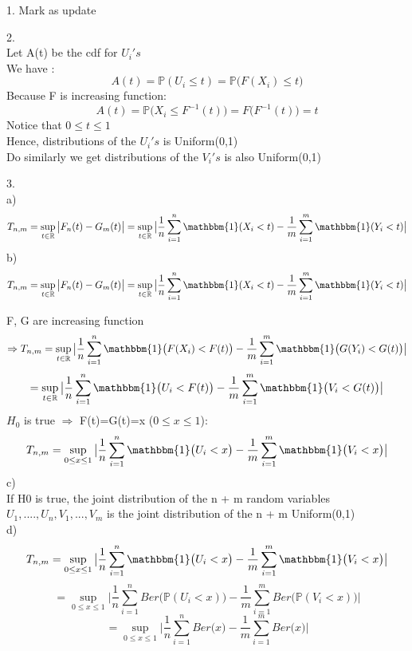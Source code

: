 \documentclass[10pt]{article}
\newenvironment{problem}[2][Problem]{\begin{trivlist}
\item[\hskip \labelsep {\bfseries #1}\hskip \labelsep {\bfseries #2.}]}{\end{trivlist}}
\begin{document}
\begin{problem}{2}
\item 1. Mark as update

\item 2. \\
Let A(t) be the cdf for $U_i's$ \\
We have :\\
\[A(t)= \mathbb{P}(U_i \leq t)=\mathbb{P}\big(F(X_i)\leq t\big)\]
Because F is increasing function:
\[A(t)= \mathbb{P}\big(X_i\leq F^{-1}(t)\big)=F\big(F^{-1}(t) \big)=t\]
Notice that $0\leq t \leq 1$ \\
Hence, distributions of the $U_i's$ is Uniform(0,1)\\
Do similarly we get distributions of the $V_i's$ is also Uniform(0,1) \\

\item 3.\\
a) \\
\[T_{n,m}=\sup_{t\in \mathbb{R}}\big|F_n(t)-G_m(t) \big|=\sup_{t\in \mathbb{R}}\big|\frac{1}{n} \sum_{i=1}^{n}\mathbbm{1}(X_i < t) -\frac{1}{m} \sum_{i=1}^{m}\mathbbm{1}(Y_i < t) \big|\]
b) \\
\[T_{n,m}=\sup_{t\in \mathbb{R}}\big|F_n(t)-G_m(t) \big|=\sup_{t\in \mathbb{R}}\big|\frac{1}{n} \sum_{i=1}^{n}\mathbbm{1}(X_i < t) -\frac{1}{m} \sum_{i=1}^{m}\mathbbm{1}(Y_i < t) \big|\]

F, G are increasing function 
\[\Rightarrow T_{n,m}= \sup_{t\in \mathbb{R}}\big|\frac{1}{n} \sum_{i=1}^{n}\mathbbm{1}\big(F(X_i) < F(t)\big) -\frac{1}{m} \sum_{i=1}^{m}\mathbbm{1}\big(G(Y_i) < G(t)\big) \big|\]
\[=\sup_{t\in \mathbb{R}}\big|\frac{1}{n} \sum_{i=1}^{n}\mathbbm{1}\big(U_i < F(t)\big) -\frac{1}{m} \sum_{i=1}^{m}\mathbbm{1}\big(V_i < G(t)\big) \big|\]
$H_0$ is true $\Rightarrow$ F(t)=G(t)=x ($0 \leq x \leq 1$):
\[T_{n,m}=\sup_{0 \leq x \leq 1}\big|\frac{1}{n} \sum_{i=1}^{n}\mathbbm{1}\big(U_i < x\big) -\frac{1}{m} \sum_{i=1}^{m}\mathbbm{1}\big(V_i < x\big) \big|\]
c)\\If H0 is true, the joint distribution of the n + m random variables $U_1,....,U_n,V_1,...,V_m$ is the joint distribution of the n + m Uniform(0,1)\\
d) \\
\[T_{n,m}=\sup_{0 \leq x \leq 1}\big|\frac{1}{n} \sum_{i=1}^{n}\mathbbm{1}\big(U_i < x\big) -\frac{1}{m} \sum_{i=1}^{m}\mathbbm{1}\big(V_i < x\big) \big|\]
\[=\sup_{0 \leq x \leq 1}\big|\frac{1}{n} \sum_{i=1}^{n}Ber\big(\mathbb{P}(U_i < x)\big) -\frac{1}{m} \sum_{i=1}^{m}Ber\big(\mathbb{P}(V_i < x)\big) \big|\]
\[=\sup_{0 \leq x \leq 1}\big|\frac{1}{n} \sum_{i=1}^{n}Ber\big(x\big) -\frac{1}{m} \sum_{i=1}^{m}Ber\big(x\big) \big|\]


\end{problem}
\end{document}
